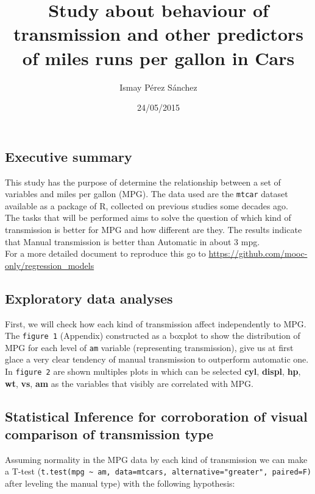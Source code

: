 \documentclass[]{article}
\title{Study about behaviour of transmission and other predictors of miles runs
per gallon in Cars}
\author{Ismay Pérez Sánchez}
\date{24/05/2015}
\begin{document}
\maketitle


\subsection{Executive summary}\label{executive-summary}

This study has the purpose of determine the relationship between a set
of variables and miles per gallon (MPG). The data used are the
\texttt{mtcar} dataset available as a package of R, collected on
previous studies some decades ago.\\The tasks that will be performed
aims to solve the question of which kind of transmission is better for
MPG and how different are they. The results indicate that Manual
transmission is better than Automatic in about 3 mpg.\\For a more
detailed document to reproduce this go to
\url{https://github.com/mooc-only/regression_models}

\subsection{Exploratory data analyses}\label{exploratory-data-analyses}

First, we will check how each kind of transmission affect independently
to MPG. The \texttt{figure 1} (Appendix) constructed as a boxplot to
show the distribution of MPG for each level of \texttt{am} variable
(representing transmission), give us at first glace a very clear
tendency of manual transmission to outperform automatic one. In
\texttt{figure 2} are shown multiples plots in which can be selected
\textbf{cyl}, \textbf{displ}, \textbf{hp}, \textbf{wt}, \textbf{vs},
\textbf{am} as the variables that visibly are correlated with MPG.

\subsection{Statistical Inference for corroboration of visual comparison
of transmission
type}\label{statistical-inference-for-corroboration-of-visual-comparison-of-transmission-type}

Assuming normality in the MPG data by each kind of transmission we can
make a T-test
(\texttt{t.test(mpg \textasciitilde{} am, data=mtcars, alternative="greater", paired=F)}
after leveling the manual type) with the following hypothesis:
\end{document}
